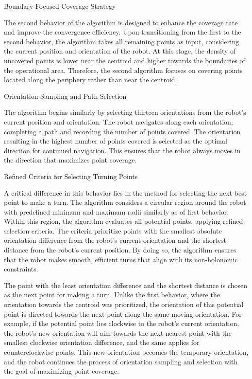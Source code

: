 \vspace*{6mm}   

Boundary-Focused Coverage Strategy

The second behavior of the algorithm is designed to enhance the coverage rate and improve the convergence efficiency. Upon transitioning from the first to the second behavior, the algorithm takes all remaining points as input, considering the current position and orientation of the robot. At this stage, the density of uncovered points is lower near the centroid and higher towards the boundaries of the operational area. Therefore, the second algorithm focuses on covering points located along the periphery rather than near the centroid.

\vspace*{6mm}   

Orientation Sampling and Path Selection

The algorithm begins similarly by selecting thirteen orientations from the robot's current position and orientation. The robot navigates along each orientation, completing a path and recording the number of points covered. The orientation resulting in the highest number of points covered is selected as the optimal direction for continued navigation. This ensures that the robot always moves in the direction that maximizes point coverage.

\vspace*{6mm}   

Refined Criteria for Selecting Turning Points

A critical difference in this behavior lies in the method for selecting the next best point to make a turn. The algorithm considers a circular region around the robot with predefined minimum and maximum radii similarly as of first behavior. Within this region, the algorithm evaluates all potential points, applying refined selection criteria. The criteria prioritize points with the smallest absolute orientation difference from the robot's current orientation and the shortest distance from the robot's current position. By doing so, the algorithm ensures that the robot makes smooth, efficient turns that align with its non-holonomic constraints.

\vspace*{6mm}   

The point with the least orientation difference and the shortest distance is chosen as the next point for making a turn. Unlike the first behavior, where the orientation towards the centroid was prioritized, the orientation of this potential point is directed towards the next point along the same moving orientation. For example, if the potential point lies clockwise to the robot's current orientation, the robot's new orientation will aim towards the next nearest point with the smallest clockwise orientation difference, and the same applies for counterclockwise points. This new orientation becomes the temporary orientation, and the robot continues the process of orientation sampling and selection with the goal of maximizing point coverage.

